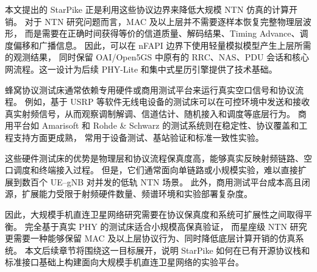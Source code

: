 本文提出的 StarPike 正是利用这些协议边界来降低大规模 NTN 仿真的计算开销。
对于 NTN 研究问题而言，MAC 及以上层并不需要逐样本恢复完整物理层波形，
而是需要在正确时间获得等价的信道质量、解码结果、Timing Advance、调度偏移和广播信息。
因此，可以在 nFAPI 边界下使用轻量模拟模型产生上层所需的观测结果，
同时保留 OAI/Open5GS 中原有的 RRC、NAS、PDU 会话和核心网流程。这一设计为后续 PHY-Lite 和集中式星历引擎提供了技术基础。


蜂窝协议测试床通常依赖专用硬件或商用测试平台来运行真实空口信号和协议流程。
例如，基于 USRP 等软件无线电设备的测试床可以在可控环境中发送和接收真实射频信号，从而观察调制解调、信道估计、随机接入和调度等底层行为。
商用平台如 Amarisoft 和 Rohde \& Schwarz 的测试系统则在稳定性、协议覆盖和工程支持方面更成熟，
常用于设备测试、基站验证和标准一致性实验\cite{amarisoft,rohdeNtn}。

这些硬件测试床的优势是物理层和协议流程保真度高，能够真实反映射频链路、空口调度和终端接入过程。
但是，它们通常面向单链路或小规模实验，难以直接扩展到数百个 UE--gNB 对并发的低轨 NTN 场景。
此外，商用测试平台成本高且闭源，扩展能力受限于射频硬件数量、频谱环境和实验部署复杂度。

因此，大规模手机直连卫星网络研究需要在协议保真度和系统可扩展性之间取得平衡。
完全基于真实 PHY 的测试床适合小规模高保真验证，
而星座级 NTN 研究更需要一种能够保留 MAC 及以上层协议行为、同时降低底层计算开销的仿真系统。
本文后续章节将围绕这一目标展开，说明 StarPike 如何在已有开源协议栈和标准接口基础上构建面向大规模手机直连卫星网络的实验平台。
